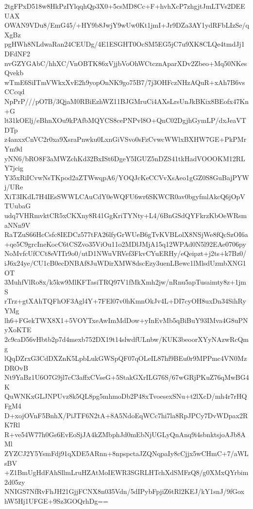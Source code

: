 2tgFPxD518w8HkPzIYlqqhQp3X0+5csMD8Cc+F+hvhXcP7zhgjtJmLTVs2DEEUAX
OWAN9VDu8/EmG45/+HY9b8JwjY9wUw0Kt1jmI+Jr9DZa3AY1ydRFbLIzSe/qXgBz
pgHWh8NLdwaRan24CEUDg/4E1ESGHT0OcSM5EG5jC7u9XK8CLQe4tmdJj1DFdNF2
nvGZYGAbC/hhXC/VnOBTK86xVjjbVoOhWCtcznAparXDv2Zbeo+Mq50NKesQvekb
wTmE6SiITmVWkxXvE2h9yopOnNK9go75B7/7j3OHFczNHzAQuR+xAh7B6vsCCcqd
NpPrP///pO7B/3QjaM0RBiEzhWZ11BJGMruCi4AXsLrsUnJkBKix8BEofx47Kn+G
lt31kOElj/eBhnXOu9kPAfbMQYCS8cePNPvl8O+QnC02DgjhGymLP/dxJeaVTDTp
z4anxxCnVC2r0xa9XsraPnwku0LxnGiVSvo0sFzCvwcWWlxBXHW7GE+PkPMrYm9d
yNN6/bRO8F3aMWZchKd32BxISt6DgeY5IGUZ5nDZS41tkHadVOOOKM12RLY7jcig
Y35xRiICvwNsTKpod2aZTWwqpA6/YOQJcKeCCVvXsAeo1gGZ0S8GuBajPYWj/URe
XiT3IKdL7H4IEsSWWLCAuCdY0eWQFU6wr6SKWCR0av0bgyfmlAkcQ6jOpVTUubaG
udq7VHRmvktCR5xCKXny8R41GgKriTYNty+L4/6BnGSdQYFkrzKbOeWRsmaNNn9V
RaTZuS66HcCsfc8IEDCz577tFA26lfyGrWUeB6gTvKVBLolX8NSjWe8fQcSzOI6a
+qe5C9grcIneKocC6tCSZvo35ViOu11o2MDlJMjA15q12WPAd0N5l92EAe0706py
NoMvfcUfCCt8eVITr9o0/utD1NWuVRVef3FkvCYuERHy/eQeipzt+j2ts+k7Bz0/
iJ6x24ye/CU1cB0ecDNBAf8JuWDirXMW8dscEzy3uenLBewc1lMlsdUzmbXNG1OT
3MuhfVlRo8x/k5kw9MlKFTasiTRQ97V1fMkXmh2jw/nRnu5apTusaimty8z+1jmS
rTrz+gtXAhTQFhOF3Agl4Y+7FEl07v0hKmnOkJv4L+DI7cyOH8uxDn34SihRyYMg
lh6+FGekTWX8X1+5VOYTxeAwImMdDow+yInEvMb5qBiBuY93IMva4G8uPNyXoKTE
2c9caD56vHbtb2p7d4mexb752DX19t14slwdfULnbw/KUK3beoorXYyNAzwRcQmg
lQqDZrxG3CdDXZnK5LpbLukGWSpQF07qOLeIL87hf9BEu0r9MPPmc4VN0MzDROvB
Nt9YaBz1U6O7G9jl7cC3affxCVseG+5StakGXrILG76S/67wGRjPKuZ76qMwBG4K
QuWNKxGLJNPUvz8k5QL8pg5mhmoDb2P48xTvoesexSNu+t2lXcD/mh4r7rHQFgM4
D+xojOVnF5BnhX/PiJTF6N2tA+8A5NdoEqWCc7hi7la8RpJPCy7DvWDpax2RK7Rl
R+ve54W77h0Gs6EvEoSjJA4kZMbphJd0mEbNjUGLyQnAnq9i4sbnktsjoAJb8AMl
ZYZCJ2Y5YsmFdj91qXDE5ARnn+8npspctaJZQNqpaIy8cCjjx5wCHmC+7/aWLsBV
+Z1BmUgHdFAhSllmLruHZAtMoIEWR3SGRLHTchXdSMFzQ8/g0XMxQYrbim2d05zy
NNIGS7NfRvFhJH21GjjFCNX8n035Vdn/5dIPybFpjiZ6tRl2KEJ/kY1snJ/9fGox
hW5Hj1UFGE+9Sz3GOQrhDg==
